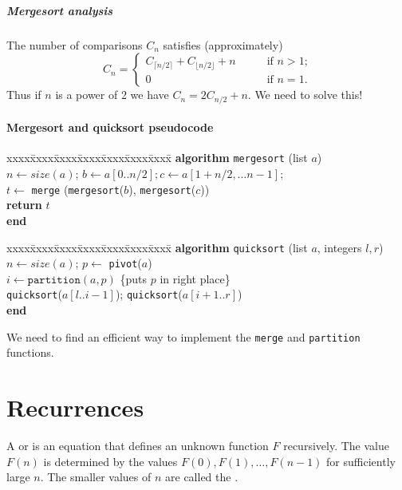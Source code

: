 \paragraph{Mergesort analysis}
The number of comparisons $C_n$ satisfies (approximately)
$$ C_n  = \left\{
\begin{array}{ll}
	C_{\lceil n/2 \rceil} + C_{\lfloor n/2 \rfloor} + n & \qquad \text{if }n > 1\text{;} \\
														0 & \qquad \text{if }n = 1\text{.}
\end{array}\right.$$
Thus if $n$ is a power of 2 we have $C_n = 2C_{n/2} + n$. We need to solve this!

\begin{frame}
\frametitle{Mergesort and quicksort pseudocode}
\begin{tabbing}
xxxx\=xxxx\=xxxx\=xxxx\=xxxx\=xxxx\=xxxx\= \kill
\textbf{algorithm} \texttt{mergesort} (list $a$) \\
$n \gets size(a)$; $b \gets a[0..n/2]; c \gets a[1+n/2, \dots n-1];$ \\
$t \gets $ \texttt{merge} (\texttt{mergesort}($b$), \texttt{mergesort}($c$)) \\
\textbf{return} $t$ \\
\textbf{end}
\end{tabbing}
\begin{tabbing}
xxxx\=xxxx\=xxxx\=xxxx\=xxxx\=xxxx\=xxxx\= \kill
\textbf{algorithm} \texttt{quicksort} (list $a$, integers $l, r$) \\
$n \gets size(a)$; $p \gets$ \texttt{pivot}($a$)\\
$i \gets \texttt{partition}(a, p)$ \quad \{puts $p$ in right place\} \\
\texttt{quicksort}($a[l..i-1]$); \texttt{quicksort}($a[i+1..r]$)\\
\textbf{end}
\end{tabbing}

We need to find an efficient way to implement the \texttt{merge} and 
\texttt{partition} functions.
\end{frame}
\fi

\chapter{Recurrences} %
\begin{Definition}
A  or  is an
equation that defines an unknown function $F$ recursively. 
The value $F(n)$ is determined by the values $F(0), F(1), \dots, F(n-1)$ for
sufficiently large $n$. The smaller values of $n$ are called the
. 
\end{Definition}

